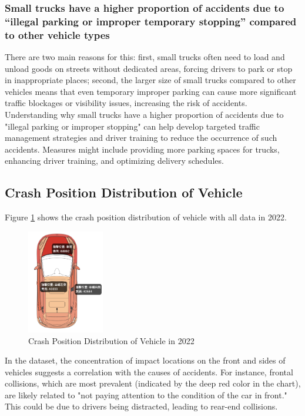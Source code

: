 \documentclass[a4paper, oneside, final, 12pt]{scrartcl} %
\begin{document}
\subsubsection{Small trucks have a higher proportion of accidents due to
“illegal parking or improper temporary stopping” compared to other vehicle types}

There are two main reasons for this: first, 
small trucks often need to load and unload goods on streets without dedicated areas, 
forcing drivers to park or stop in inappropriate places; second, 
the larger size of small trucks compared to other vehicles means that 
even temporary improper parking can cause more significant traffic blockages or 
visibility issues, increasing the risk of accidents. Understanding why 
small trucks have a higher proportion of accidents due to 
"illegal parking or improper stopping" can help develop targeted traffic 
management strategies and driver training to reduce the occurrence of such accidents. 
Measures might include providing more parking spaces for trucks, enhancing driver training,
 and optimizing delivery schedules.

\subsection{Crash Position Distribution of Vehicle}

Figure \ref{fig: insight_crash} shows the crash position distribution of vehicle
with all data in 2022.

\begin{figure}[htbp]
  \centering
  \includegraphics[width=0.3\textwidth]{"./Image/insight_position.png"}
  \caption{Crash Position Distribution of Vehicle in 2022}
  \label{fig: insight_crash}
\end{figure}

In the dataset, the concentration of impact locations on the front and sides 
of vehicles suggests a correlation with the causes of accidents. 
For instance, frontal collisions, which are most prevalent 
(indicated by the deep red color in the chart), are likely related to 
"not paying attention to the condition of the car in front." 
This could be due to drivers being distracted, leading to rear-end collisions.
\end{document}
